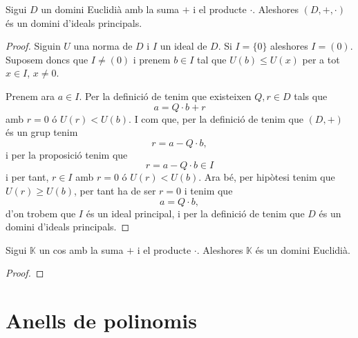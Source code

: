 \documentclass[../Apunts.tex]{subfiles}
\begin{document}
	\begin{theorem}
		Sigui \(D\) un domini Euclidià amb la suma \(+\) i el producte \(\cdot\). Aleshores \((D,+,\cdot)\) és un domini d'ideals principals.
		\begin{proof}
			Siguin \(U\) una norma de \(D\) i \(I\) un ideal de \(D\). Si \(I=\{0\}\) aleshores \(I=(0)\). Suposem doncs que \(I\neq(0)\) i prenem \(b\in I\) tal que \(U(b)\leq U(x)\) per a tot \(x\in I\), \(x\neq0\).
			
			Prenem ara \(a\in I\). Per la definició de  tenim que existeixen \(Q,r\in D\) tals que
			\[a=Q\cdot b+r\]
			amb \(r=0\) ó \(U(r)<U(b)\). I com que, per la definició de  tenim que \((D,+)\) és un grup tenim
			\[r=a-Q\cdot b,\]
			i per la proposició  tenim que
			\[r=a-Q\cdot b\in I\]
			i per tant, \(r\in I\) amb \(r=0\) ó \(U(r)<U(b)\). Ara bé, per hipòtesi tenim que \(U(r)\geq U(b)\), per tant ha de ser \(r=0\) i tenim que
			\[a=Q\cdot b,\]
			d'on trobem que \(I\) és un ideal principal, i per la definició de  tenim que \(D\) és un domini d'ideals principals.
		\end{proof}
	\end{theorem}
	\begin{theorem}
		Sigui \(\mathbb{K}\) un cos amb la suma \(+\) i el producte \(\cdot\). Aleshores \(\mathbb{K}\) és un domini Euclidià.
		\begin{proof}
		\end{proof}
	\end{theorem}
	\section{Anells de polinomis}
\end{document}
